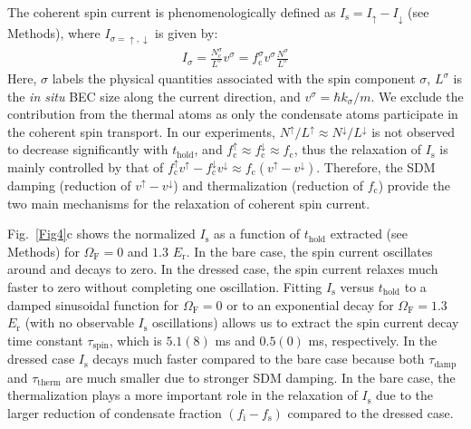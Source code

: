 \documentclass[showpacs,preprintnumbers,amsmath,amssymb, superscriptaddress, aps, reprint]{revtex4-1}
\def\E_r{E_{\text{r}}}
\def\OmegaF{\Omega_{\text{F}}}
\def\thold{t_{\text{hold}}}
\begin{document}
{The coherent spin current is phenomenologically defined as ${I_{\text{s}}} = {I_ \uparrow } - {I_ \downarrow }$ ({see Methods}), where $I_{\sigma=\uparrow, \downarrow}$ is given by: 
\begin{align}
\label{eq_spin_current}
{I_\sigma} = \frac{{N_{\text{c}}^\sigma }}{{{L^\sigma }}}{v^\sigma } = f_{\text{c}}^\sigma {v^\sigma }\frac{{{N^\sigma }}}{{{L^\sigma }}}
\end{align}
Here, $\sigma$ labels the physical quantities associated with the spin component $\sigma$, ${L^\sigma }$ is the \textit{in situ} BEC size along the current direction, and ${v^\sigma } = \hbar {k_\sigma }/m$. We exclude the contribution from the thermal atoms as only the condensate atoms participate in the coherent spin transport. In our experiments, ${N^ \uparrow }/{L^ \uparrow } \approx {N^ \downarrow }/{L^ \downarrow }$ is not observed to decrease significantly with $\thold$, and $f_{\text{c}}^ \uparrow  \approx f_{\text{c}}^ \downarrow  \approx {f_{\text{c}}}$, thus the relaxation of $I_{\text{s}}$ is mainly controlled by that of $f_{\text{c}}^ \uparrow {v^ \uparrow } - f_{\text{c}}^ \downarrow {v^ \downarrow } \approx {f_{\text{c}}}({v^ \uparrow } - {v^ \downarrow })$. Therefore, the SDM damping (reduction of ${v^ \uparrow } - {v^ \downarrow }$) and thermalization (reduction of $f_{\text{c}}$) provide the two main mechanisms for the relaxation of coherent spin current.


Fig.~\ref{Fig4}c shows the normalized $I_{\text{s}}$ as a function of $\thold$ extracted ({see Methods}) for $\OmegaF = 0$ and $1.3$ $\E_r$. In the bare case, the spin current oscillates around and decays to zero. In the dressed case, the spin current relaxes much faster to zero without completing one oscillation. Fitting $I_{\text{s}}$ versus $\thold$ to a damped sinusoidal function for $\OmegaF = 0$ or to an exponential decay for $\OmegaF = 1.3$ $\E_r$ (with no observable $I_{\text{s}}$ oscillations) allows us to extract the spin current decay time constant ${\tau_{\text{spin}}}$, which is $5.1(8)$ ms and $0.5(0)$ ms, respectively. In the dressed case $I_{\text{s}}$ decays much faster compared to the bare case because both $\tau_{\text{damp}}$ and $\tau_{\text{therm}}$ are much smaller due to stronger SDM damping. In the bare case, the thermalization plays a more important role in the relaxation of $I_{\text{s}}$ due to the larger reduction of condensate fraction $\left( {f_{\text{i}} - {f_{\text{s}}}} \right)$ compared to the dressed case.

\vspace{5mm}

}
\end{document}
